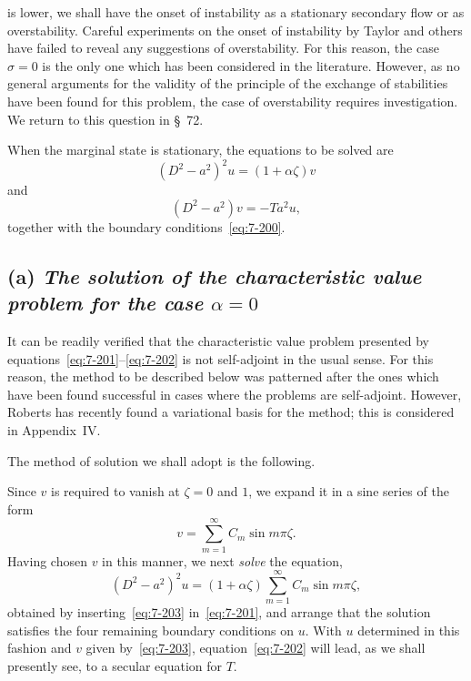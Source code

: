 is lower, we shall have the onset of instability as a stationary secondary
flow or as overstability.  Careful experiments on the onset of instability
by Taylor and others have failed to reveal any suggestions of overstability.  For this reason, the case $\sigma = 0$ is the only one which has been
considered in the literature.  However, as no general arguments for the
validity of the principle of the exchange of stabilities have been found
for this problem, the case of overstability requires investigation.  We
return to this question in \S~72.

When the marginal state is stationary, the equations to be solved are
\begin{equation}
\label{eq:7-201}
(D^2-a^2)^2 u = (1+\alpha\zeta)v
\end{equation}
and
\begin{equation}
\label{eq:7-202}
(D^2-a^2)v = -Ta^2 u,
\end{equation}
together with the boundary conditions~\eqref{eq:7-200}.

\subsection*{(a) \emph{The solution of the characteristic value problem for the case
$\alpha = 0$}}
It can be readily verified that the characteristic value problem presented by equations~\eqref{eq:7-201}--\eqref{eq:7-202} is not self-adjoint in the usual sense.
For this reason, the method to be described below was patterned after the
ones which have been found successful in cases where the problems are
self-adjoint.  However, Roberts has recently found a variational basis
for the method; this is considered in Appendix~IV.

The method of solution we shall adopt is the following.

Since $v$ is required to vanish at $\zeta = 0$ and $1$, we expand it in a sine
series of the form
\begin{equation}
\label{eq:7-203}
v = \sum_{m=1}^{\infty} C_m \sin m\pi\zeta.
\end{equation}
Having chosen $v$ in this manner, we next \emph{solve} the equation,
\begin{equation}
\label{eq:7-204}
(D^2-a^2)^2 u = (1+\alpha\zeta)\sum_{m=1}^{\infty} C_m \sin m\pi\zeta,
\end{equation}
obtained by inserting~\eqref{eq:7-203} in~\eqref{eq:7-201}, and arrange that the solution
satisfies the four remaining boundary conditions on $u$.  With $u$ determined
in this fashion and $v$ given by~\eqref{eq:7-203}, equation~\eqref{eq:7-202} will lead, as we shall
presently see, to a secular equation for $T$.

